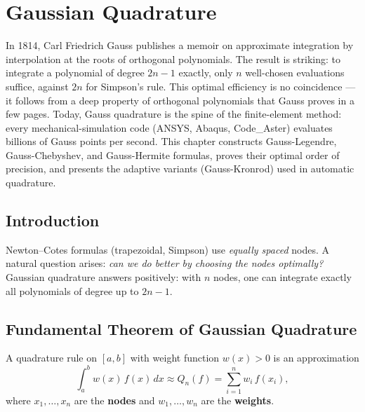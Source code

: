 
\chapter{Gaussian Quadrature}
\label{ch:gauss-quadrature}


In 1814, Carl Friedrich Gauss publishes a memoir on approximate integration by interpolation at the roots of orthogonal polynomials. The result is striking: to integrate a polynomial of degree $2n-1$ exactly, only $n$ well-chosen evaluations suffice, against $2n$ for Simpson's rule. This optimal efficiency is no coincidence --- it follows from a deep property of orthogonal polynomials that Gauss proves in a few pages. Today, Gauss quadrature is the spine of the finite-element method: every mechanical-simulation code (ANSYS, Abaqus, Code\_Aster) evaluates billions of Gauss points per second. This chapter constructs Gauss-Legendre, Gauss-Chebyshev, and Gauss-Hermite formulas, proves their optimal order of precision, and presents the adaptive variants (Gauss-Kronrod) used in automatic quadrature.

\section{Introduction}

Newton--Cotes formulas (trapezoidal, Simpson) use \emph{equally spaced} nodes. A natural question arises: \emph{can we do better by choosing the nodes optimally?} Gaussian quadrature answers positively: with $n$ nodes, one can integrate exactly all polynomials of degree up to $2n - 1$.

\section{Fundamental Theorem of Gaussian Quadrature}

\begin{definition}
\label{def:quadrature}
A quadrature rule on $[a,b]$ with weight function $w(x) > 0$ is an approximation
\[
    \int_a^b w(x)\,f(x)\,dx \approx Q_n(f) = \sum_{i=1}^{n} w_i\, f(x_i),
\]
where $x_1, \ldots, x_n$ are the \textbf{nodes} and $w_1, \ldots, w_n$ are the \textbf{weights}.
\end{definition}

